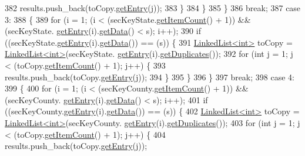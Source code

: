 \begin{DoxyCode}
382                 results.push\_back(toCopy.\hyperlink{classLinkedList_a341bfd7772c9d24d29eb7a7f3936915b}{getEntry}(j));
383             \}
384         \}
385     \}
386     \textcolor{keywordflow}{break};
387     \textcolor{keywordflow}{case} 3:
388     \{
389         \textcolor{keywordflow}{for} (i = 1; (i < (secKeyState.\hyperlink{classLinkedList_afc6635f854f48f2f126cf3b60d845220}{getItemCount}() + 1)) && (secKeyState.
      \hyperlink{classLinkedList_a341bfd7772c9d24d29eb7a7f3936915b}{getEntry}(i).\hyperlink{classSecKeySS_add52510d280d0ca89b653386500f08f5}{getData}() < s); i++);
390         \textcolor{keywordflow}{if} ((secKeyState.\hyperlink{classLinkedList_a341bfd7772c9d24d29eb7a7f3936915b}{getEntry}(i).\hyperlink{classSecKeySS_add52510d280d0ca89b653386500f08f5}{getData}()) == (s)) \{
391             \hyperlink{classLinkedList}{LinkedList<int>} toCopy = \hyperlink{classLinkedList}{LinkedList<int>}(secKeyState.
      \hyperlink{classLinkedList_a341bfd7772c9d24d29eb7a7f3936915b}{getEntry}(i).\hyperlink{classSecKeySS_aaae9db891cfcdc3f78d8a44145f4f08c}{getDuplicates}());
392             \textcolor{keywordflow}{for} (\textcolor{keywordtype}{int} j = 1; j < (toCopy.\hyperlink{classLinkedList_afc6635f854f48f2f126cf3b60d845220}{getItemCount}() + 1); j++) \{
393                 results.push\_back(toCopy.\hyperlink{classLinkedList_a341bfd7772c9d24d29eb7a7f3936915b}{getEntry}(j));
394             \}
395         \}
396     \}
397     \textcolor{keywordflow}{break};
398     \textcolor{keywordflow}{case} 4:
399     \{
400         \textcolor{keywordflow}{for} (i = 1; (i < (secKeyCounty.\hyperlink{classLinkedList_afc6635f854f48f2f126cf3b60d845220}{getItemCount}() + 1)) && (secKeyCounty.
      \hyperlink{classLinkedList_a341bfd7772c9d24d29eb7a7f3936915b}{getEntry}(i).\hyperlink{classSecKeySS_add52510d280d0ca89b653386500f08f5}{getData}() < s); i++);
401         \textcolor{keywordflow}{if} ((secKeyCounty.\hyperlink{classLinkedList_a341bfd7772c9d24d29eb7a7f3936915b}{getEntry}(i).\hyperlink{classSecKeySS_add52510d280d0ca89b653386500f08f5}{getData}()) == (s)) \{
402             \hyperlink{classLinkedList}{LinkedList<int>} toCopy = \hyperlink{classLinkedList}{LinkedList<int>}(secKeyCounty.
      \hyperlink{classLinkedList_a341bfd7772c9d24d29eb7a7f3936915b}{getEntry}(i).\hyperlink{classSecKeySS_aaae9db891cfcdc3f78d8a44145f4f08c}{getDuplicates}());
403             \textcolor{keywordflow}{for} (\textcolor{keywordtype}{int} j = 1; j < (toCopy.\hyperlink{classLinkedList_afc6635f854f48f2f126cf3b60d845220}{getItemCount}() + 1); j++) \{
404                 results.push\_back(toCopy.\hyperlink{classLinkedList_a341bfd7772c9d24d29eb7a7f3936915b}{getEntry}(j));

\end{DoxyCode}
